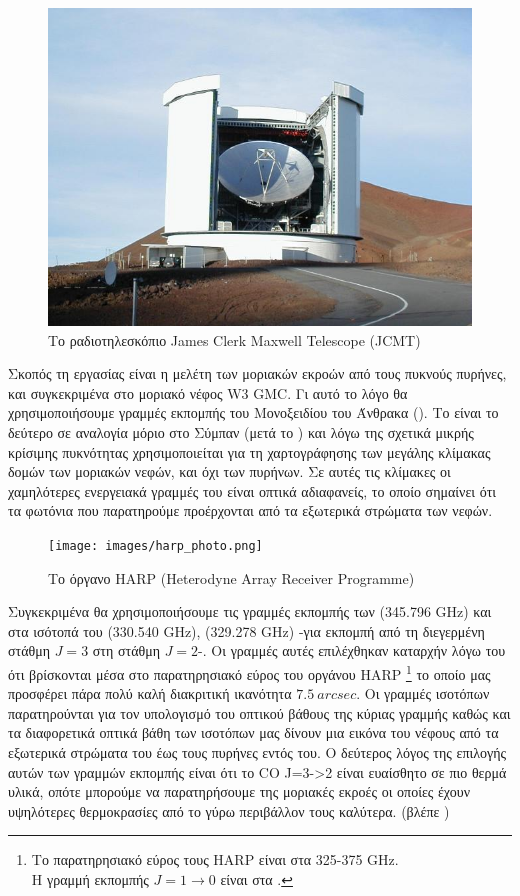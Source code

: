 \documentclass[a4paper,12pt]{memoir}
\begin{document}
\begin{figure}[hb]
	\centering
	\includegraphics[width=12cm]{images/JCMT.jpg}
	\caption{Το ραδιοτηλεσκόπιο James Clerk Maxwell Telescope (JCMT)}
\end{figure}

Σκοπός τη εργασίας είναι η μελέτη των μοριακών εκροών από τους πυκνούς πυρήνες, και συγκεκριμένα στο μοριακό νέφος W3 GMC. Γι αυτό το λόγο θα χρησιμοποιήσουμε γραμμές εκπομπής του Μονοξειδίου του Άνθρακα (). Το  είναι το δεύτερο σε αναλογία μόριο στο Σύμπαν (μετά το ) και λόγω της σχετικά μικρής κρίσιμης πυκνότητας χρησιμοποιείται για τη χαρτογράφησης των μεγάλης κλίμακας δομών των μοριακών νεφών, και όχι των πυρήνων. Σε αυτές τις κλίμακες οι χαμηλότερες ενεργειακά γραμμές του  είναι οπτικά αδιαφανείς, το οποίο σημαίνει ότι τα φωτόνια που παρατηρούμε προέρχονται από τα εξωτερικά στρώματα των νεφών.

\begin{figure}
	\begin{flushright}
		\texttt{[image: images/harp\_photo.png]}
		\caption{Το όργανο HARP (Heterodyne Array Receiver Programme)}
	\end{flushright}
\end{figure}


Συγκεκριμένα θα χρησιμοποιήσουμε τις γραμμές εκπομπής των  (345.796 GHz) και στα ισότοπά του  (330.540 GHz),  (329.278 GHz) -για εκπομπή από τη διεγερμένη στάθμη $J=3$ στη στάθμη $J=2$-. Οι γραμμές αυτές επιλέχθηκαν καταρχήν λόγω του ότι βρίσκονται μέσα στο παρατηρησιακό εύρος του οργάνου HARP \footnote{Το παρατηρησιακό εύρος τους HARP είναι στα 325-375 GHz. \\ Η γραμμή εκπομπής  $J=1\to 0$ είναι στα .} το οποίο μας προσφέρει πάρα πολύ καλή διακριτική ικανότητα $7.5\ arcsec$. 
 Οι γραμμές ισοτόπων παρατηρούνται για τον υπολογισμό του οπτικού βάθους της κύριας γραμμής καθώς και τα διαφορετικά οπτικά βάθη των ισοτόπων μας δίνουν μια εικόνα του νέφους από τα εξωτερικά στρώματα του έως τους πυρήνες εντός του.
Ο δεύτερος λόγος της επιλογής αυτών των γραμμών εκπομπής είναι ότι το CO J=3->2 είναι ευαίσθητο σε πιο θερμά υλικά, οπότε μπορούμε να παρατηρήσουμε της μοριακές εκροές οι οποίες έχουν υψηλότερες θερμοκρασίες από το γύρω περιβάλλον τους καλύτερα. (βλέπε )
\end{document}
